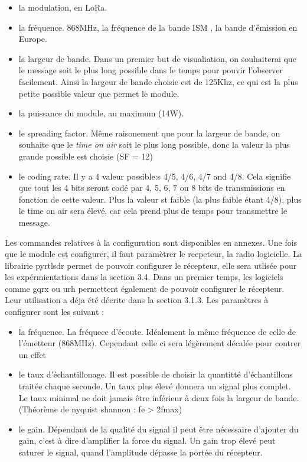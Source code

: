\begin{itemize}
\item la modulation, en LoRa.
\item la fréquence. 868MHz, la fréquence de la bande ISM , la bande d'émission en Europe.
\item la largeur de bande. Dans un premier but de visualiation, on souhaiterai que le message soit le plus long possible dans le temps pour pouvir l'observer facilement. Ainsi la largeur de bande choisie est de 125Khz, ce qui est la plus petite possible valeur que permet le module.
\item la puissance du module, au maximum (14W).
\item le spreading factor. Même raisonement que pour la largeur de bande, on souhaite que le \textit{time on air} soit le plus long possible, donc la valeur la plus grande possible est choisie (SF = 12)
\item le coding rate. Il y a 4 valeur possible:s 4/5, 4/6, 4/7 and 4/8. Cela signifie que tout les 4 bits seront codé par 4, 5, 6, 7 ou 8 bits de transmissions en fonction de cette valeur. Plus la valeur st faible (la plus faible étant 4/8), plus le time on air sera élevé, car cela prend plus de temps pour transmettre le message.
\end{itemize}

Les commandes relatives à la configuration sont disponibles en annexes.
Une fois que le module est configurer, il faut paramètrer le recpeteur, la radio logicielle. La librairie pyrtlsdr permet de pouvoir configurer le récepteur, elle sera utlisée pour les expérmientations dans la section 3.4. Dans un premier temps, les logiciels comme gqrx ou urh permettent également de pouvoir configurer le récepteur. Leur utilisation a déja été décrite dans la section 3.1.3. Les paramètres à configurer sont les suivant : 

\begin{itemize}
\item la fréquence. La fréquece d'écoute. Idéalement la même fréquence de celle de l'émetteur (868MHz). Cependant celle ci sera légèrement décalée pour contrer un effet
\item le taux d'échantillonage. Il est possible de choisir la quantitté d'échantillons traitée chaque seconde. Un taux plus élevé donnera un signal plus complet. Le taux minimal ne doit jamais être inférieur à deux fois la largeur de bande. (Théorème de nyquist shannon : fe > 2fmax)
\item le gain. Dépendant de la qualité du signal il peut être nécessaire d'ajouter du gain, c'est à dire d'amplifier la force du signal. Un gain trop élevé peut saturer le signal, quand l'amplitude dépasse la portée du récepteur.
\end{itemize}

